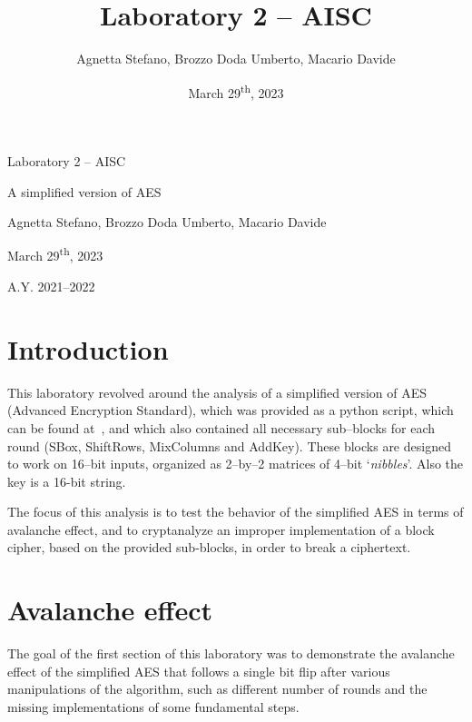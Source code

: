 \documentclass[12pt]{article}
\title{Laboratory 2 – AISC}
\author{Agnetta Stefano, Brozzo Doda Umberto, Macario Davide}
\date{March 29\textsuperscript{th}, 2023}
\newcommand\titleofdoc{Laboratory 2 – AISC} %
\newcommand\GroupName{Agnetta Stefano, Brozzo Doda Umberto, Macario Davide}
\newcommand\CurrDate{March 29\textsuperscript{th}, 2023}
\begin{document}
\begin{titlepage}
   \begin{center}
        \vspace*{4cm} %

        \Huge{\titleofdoc} 

        \vspace{0.5cm}
        \LARGE{A simplified version of AES}
            
        \vspace{3 cm}
        \Large{\GroupName\\}
       
        \vspace{4 cm}
       
        \vspace{4 cm}
        \Large{\CurrDate}
        
        \vspace{0.25 cm}
        \Large{A.Y. 2021–2022}
       
       \vfill
    \end{center}
\end{titlepage}

\section{Introduction}
\label{sec:01}

This laboratory revolved around the analysis of a simplified version of AES (Advanced Encryption Standard), which was provided as a python script, which can be found at~\cite{Original Python implementation}, and which also contained all necessary sub–blocks for each round (SBox, ShiftRows, MixColumns and AddKey).
These blocks are designed to work on 16–bit inputs, organized as 2–by–2 matrices of 4–bit `\textit{nibbles}'. Also the key is a 16-bit string.

The focus of this analysis is to test the behavior of the simplified AES in terms of avalanche effect, and to cryptanalyze an improper implementation of a block cipher, based on the provided sub-blocks, in order to break a ciphertext.

\section{Avalanche effect}
\label{sec:02}

The goal of the first section of this laboratory was to demonstrate the avalanche effect of the simplified AES that follows a single bit flip after various manipulations of the algorithm, such as different number of rounds and the missing implementations of some fundamental steps.
\end{document}

